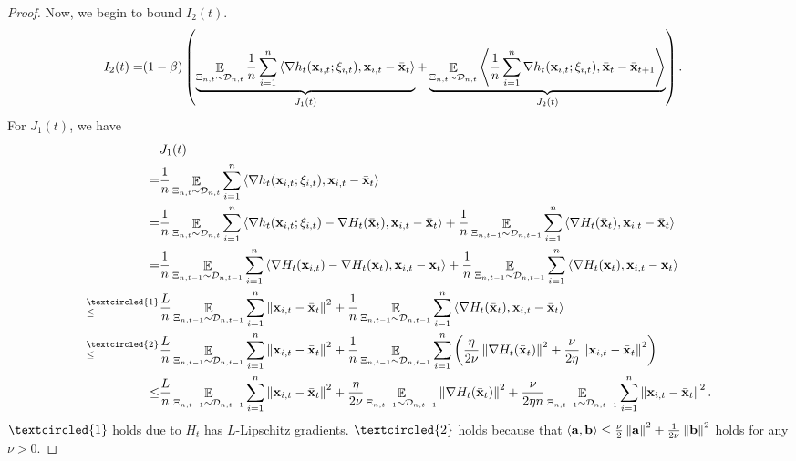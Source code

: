 \documentclass{article}
\begin{document}
\begin{proof}
Now, we begin to bound $I_2(t)$.
\begin{align}
\nonumber
I_2(t) = & (1-\beta)  \left( \underbrace{ \mathop{\mathbb{E}}_{ \Xi_{n,t} \sim \mathcal{D}_{n,t} }\frac{1}{n}\sum_{i=1}^n\left\langle\nabla h_t({\bf x}_{i,t}; \xi_{i,t}), {\bf x}_{i,t} - \bar{{\bf x}}_t  \right\rangle }_{J_1(t)} +  \underbrace{ \mathop{\mathbb{E}}_{ \Xi_{n,t} \sim \mathcal{D}_{n,t} }\left\langle\frac{1}{n}\sum_{i=1}^n \nabla h_t({\bf x}_{i,t};\xi_{i,t}), \bar{{\bf x}}_t - \bar{{\bf x}}_{t+1}  \right\rangle}_{J_2(t)} \right).
\end{align} For $J_1(t)$, we have
\begin{align}
\nonumber
& J_1(t) \\ \nonumber 
= & \frac{1}{n}\EE_{ \Xi_{n,t} \sim \Dcal_{n,t} }\sum_{i=1}^n\lrangle{\nabla h_t(\x_{i,t}; \xi_{i,t}), \x_{i,t} - \bar{\x}_t } \\ \nonumber
= & \frac{1}{n}\EE_{ \Xi_{n,t} \sim \Dcal_{n,t} } \sum_{i=1}^n\lrangle{\nabla h_t(\x_{i,t}; \xi_{i,t}) - \nabla H_t(\bar{\x}_t), \x_{i,t} - \bar{\x}_t } + \frac{1}{n}\EE_{ \Xi_{n,t-1} \sim \Dcal_{n,t-1} }\sum_{i=1}^n\lrangle{\nabla H_t(\bar{\x}_t), \x_{i,t} - \bar{\x}_t } \\ \nonumber
= & \frac{1}{n}\EE_{ \Xi_{n,t-1} \sim \Dcal_{n,t-1} }\sum_{i=1}^n\lrangle{\nabla H_t(\x_{i,t}) - \nabla H_t(\bar{\x}_t), \x_{i,t} - \bar{\x}_t } + \frac{1}{n}\EE_{ \Xi_{n,t-1} \sim \Dcal_{n,t-1} }\sum_{i=1}^n\lrangle{\nabla H_t(\bar{\x}_t), \x_{i,t} - \bar{\x}_t } \\ \nonumber
\refabovecir{\le}{\textcircled{1}} & \frac{L}{n}\EE_{ \Xi_{n,t-1} \sim \Dcal_{n,t-1} }\sum_{i=1}^n \lrnorm{\x_{i,t} - \bar{\x}_t}^2 + \frac{1}{n}\EE_{ \Xi_{n,t-1} \sim \Dcal_{n,t-1} }\sum_{i=1}^n\lrangle{\nabla H_t(\bar{\x}_t), \x_{i,t} - \bar{\x}_t } \\ \nonumber
\refabovecir{\le}{\textcircled{2}} & \frac{L}{n}\EE_{ \Xi_{n,t-1} \sim \Dcal_{n,t-1} }\sum_{i=1}^n \lrnorm{\x_{i,t} - \bar{\x}_t}^2 + \frac{1}{n}\EE_{ \Xi_{n,t-1} \sim \Dcal_{n,t-1} }\sum_{i=1}^n\lrincir{\frac{\eta}{2\nu}\lrnorm{\nabla H_t(\bar{\x}_t)}^2 + \frac{\nu}{2\eta}\lrnorm{\x_{i,t} - \bar{\x}_t }^2 } \\ \label{equa_theorem_temp0}
\le & \frac{L}{n}\EE_{ \Xi_{n,t-1} \sim \Dcal_{n,t-1} }\sum_{i=1}^n \lrnorm{\x_{i,t} - \bar{\x}_t}^2 + \frac{\eta}{2\nu}\EE_{ \Xi_{n,t-1} \sim \Dcal_{n,t-1} }\lrnorm{\nabla H_t(\bar{\x}_t)}^2 + \frac{\nu}{2\eta n}\EE_{ \Xi_{n,t-1} \sim \Dcal_{n,t-1} }\sum_{i=1}^n\lrnorm{\x_{i,t} - \bar{\x}_t }^2. 
\end{align} $\textcircled{1}$ holds due to $H_t$ has $L$-Lipschitz gradients. $\textcircled{2}$ holds because that $\left\langle{\bf a},{\bf b} \right\rangle \le \frac{\nu}{2}\left\lVert{\bf a}\right\rVert^2 + \frac{1}{2\nu}\left\lVert{\bf b}\right\rVert^2$ holds for any $\nu>0$. 


\end{proof}
\end{document}

